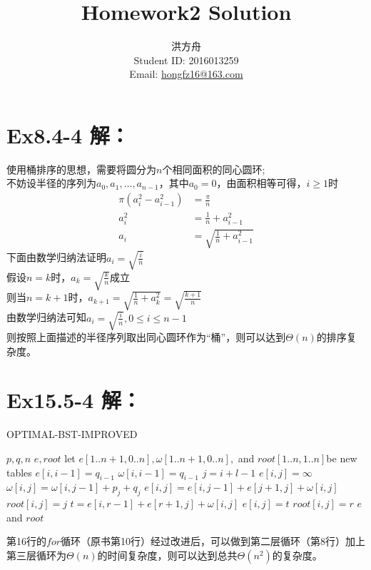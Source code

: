\documentclass[12pt]{article}
\title{Homework2 Solution}
\author{洪方舟\\Student ID: 2016013259\\Email: \href{mailto:hongfz16@163.com}{hongfz16@163.com}}
\begin{document}
  \maketitle
  \section*{Ex8.4-4 \textbf{解：}}
  	使用桶排序的思想，需要将圆分为$n$个相同面积的同心圆环;\\
  	不妨设半径的序列为$a_0,a_1,\ldots,a_{n-1}$，其中$a_0=0$，由面积相等可得，$i\geq1$时
  	\begin{align*}
  	  \pi(a_i^2-a_{i-1}^2) &= \frac{\pi}{n}\\
  	  a_i^2 &= \frac{1}{n}+a_{i-1}^2\\
  	  a_i &= \sqrt{\frac{1}{n}+a_{i-1}^2}
  	\end{align*}
  	下面由数学归纳法证明$a_i=\sqrt{\frac{i}{n}}$\\
  	假设$n=k$时，$a_k=\sqrt{\frac{k}{n}}$成立\\
  	则当$n=k+1$时，$a_{k+1}=\sqrt{\frac{1}{n}+a_k^2}=\sqrt{\frac{k+1}{n}}$\\
  	由数学归纳法可知$a_i=\sqrt{\frac{i}{n}},0\leq i \leq n-1$\\
  	则按照上面描述的半径序列取出同心圆环作为“桶”，则可以达到$\Theta(n)$的排序复杂度。
  \section*{Ex15.5-4 \textbf{解：}}
    \begin{algorithm}  
        \caption{OPTIMAL-BST-IMPROVED}
        \begin{algorithmic}[1]  
            \Require $p,q,n$
            \Ensure $e,root$
                \State let $e[1..n+1,0..n],\omega[1..n+1,0..n],$ and $root[1..n,1..n]$be new tables
                	\State$e[i,i-1]=q_{i-1}$
                	\State$\omega[i,i-1]=q_{i-1}$
                \EndFor
               			\State$j=i+l-1$
               			\State$e[i,j]=\infty$
               			\State$\omega[i,j]=\omega[i,j-1]+p_j+q_j$
               				\State $e[i,j]=e[i,j-1]+e[j+1,j]+\omega[i,j]$
               				\State $root[i,j]=j$
               			\Else
               					\State $t=e[i,r-1]+e[r+1,j]+\omega[i,j]$
               						\State $e[i,j]=t$
               						\State $root[i,j]=r$
               					\EndIf
               				\EndFor
               			\EndIf
               		\EndFor
               	\EndFor
               	\State \Return $e$ and $root$
            \EndFunction
        \end{algorithmic}
    \end{algorithm}
    第16行的$for$循环（原书第10行）经过改进后，可以做到第二层循环（第8行）加上第三层循环为$\Theta(n)$的时间复杂度，则可以达到总共$\Theta(n^2)$的复杂度。
\end{document}
